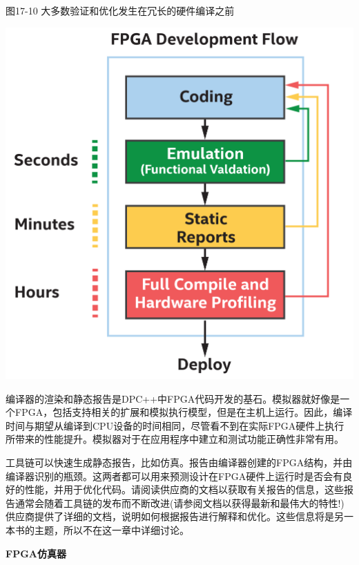 \hspace*{\fill} \par %
图17-10 大多数验证和优化发生在冗长的硬件编译之前
\begin{center}
	\includegraphics[width=1.0\textwidth]{content/chapter-17/images/10}
\end{center}

编译器的渲染和静态报告是DPC++中FPGA代码开发的基石。模拟器就好像是一个FPGA，包括支持相关的扩展和模拟执行模型，但是在主机上运行。因此，编译时间与期望从编译到CPU设备的时间相同，尽管看不到在实际FPGA硬件上执行所带来的性能提升。模拟器对于在应用程序中建立和测试功能正确性非常有用。\par

工具链可以快速生成静态报告，比如仿真。报告由编译器创建的FPGA结构，并由编译器识别的瓶颈。这两者都可以用来预测设计在FPGA硬件上运行时是否会有良好的性能，并用于优化代码。请阅读供应商的文档以获取有关报告的信息，这些报告通常会随着工具链的发布而不断改进(请参阅文档以获得最新和最伟大的特性!)供应商提供了详细的文档，说明如何根据报告进行解释和优化。这些信息将是另一本书的主题，所以不在这一章中详细讨论。\par

\hspace*{\fill} \par %
\textbf{FPGA仿真器}

